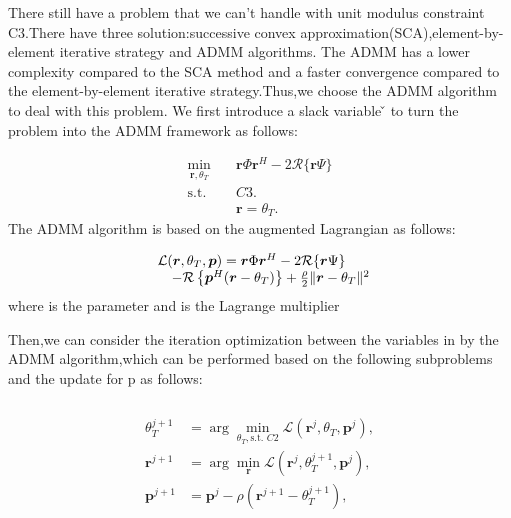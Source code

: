 \documentclass[journal,comsoc]{IEEEtran}
\begin{document}
	
	There still have a problem that we can't handle with unit modulus constraint C3.There have three solution:successive convex approximation(SCA),element-by-element iterative strategy and ADMM algorithms.
	The ADMM has a lower complexity compared to the SCA method and a faster convergence compared to the element-by-element iterative strategy.Thus,we choose the ADMM algorithm to deal with this problem. We first introduce a slack variable \v{} to turn the problem into the ADMM framework as follows:
	
	\begin{align}
		\min_{\boldsymbol{r},\theta_T} \quad & \boldsymbol{r}\Phi\boldsymbol{r}^H - 2\mathcal{R}\{\boldsymbol{r}\Psi\} \label{16a} \\
		\text{s.t.} \quad & C3. \label{16b} \\
		& \boldsymbol{r} = \theta_T. \label{16c}
	\end{align}
    The ADMM algorithm is based on the augmented Lagrangian as follows:
    
    \begin{equation}
    	\begin{array}{l@{}l} 
    		\mathcal{L}(\boldsymbol{r}, \theta_T, \boldsymbol{p}) = \boldsymbol{r}\Phi\boldsymbol{r}^H - 2\mathcal{R}\{\boldsymbol{r}\Psi\} \\
    		\quad - \mathcal{R}\left\{\boldsymbol{p}^H(\boldsymbol{r}- \theta_T)\right\} + \frac{\rho}{2}\|\boldsymbol{r} - \theta_T\|^2  
    	\end{array}
    \end{equation}
	where  is the parameter and  is the Lagrange multiplier
	

	
	Then,we can consider the iteration optimization between the variables in by the ADMM algorithm,which can be performed based on the following subproblems and the update for p as follows:
	
		\begin{align}
		\\ \\
		\theta_T^{j+1} &= \arg \min_{\theta_T, \text{s.t. } C2} \mathcal{L}(\pmb{r}^j, \theta_T, \pmb{p}^j), \tag{18a} \\
		\pmb{r}^{j+1} &= \arg \min_{\pmb{r}} \mathcal{L}(\pmb{r}^j, \theta_T^{j+1}, \pmb{p}^j), \tag{18b} \\
		\pmb{p}^{j+1} &= \pmb{p}^j - \rho(\pmb{r}^{j+1} - \theta_T^{j+1}), \tag{18c}
	\end{align}
	
\end{document}

